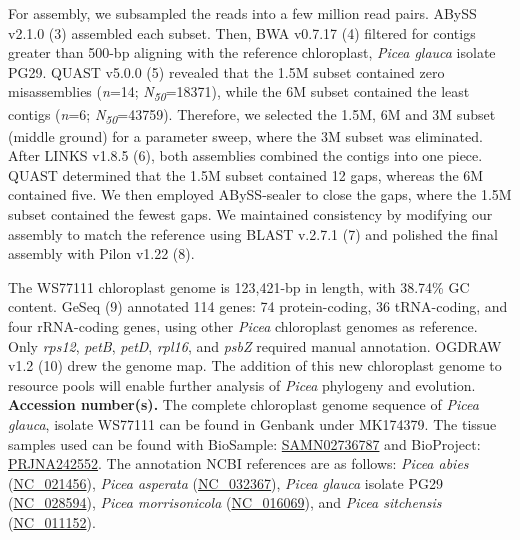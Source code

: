 \documentclass[titlepage,11pt, oneside]{article}   	%
\begin{document}
\newline
\par
For assembly, we subsampled the reads into a few million read pairs. ABySS v2.1.0 (3) assembled each subset. Then, BWA v0.7.17 (4) filtered for contigs greater than 500-bp aligning with the reference chloroplast, \textit{Picea glauca} isolate PG29. QUAST v5.0.0 (5) revealed that the 1.5M subset contained zero misassemblies (\textit{n}=14; \textit{N\textsubscript{50}}=18371), while the 6M subset contained the least contigs (\textit{n}=6; \textit{N\textsubscript{50}}=43759). Therefore, we selected the 1.5M, 6M and 3M subset (middle ground) for a parameter sweep, where the 3M subset was eliminated. After LINKS v1.8.5 (6), both assemblies combined the contigs into one piece. QUAST determined that the 1.5M subset contained 12 gaps, whereas the 6M contained five. We then employed ABySS-sealer to close the gaps, where the 1.5M subset contained the fewest gaps. We maintained consistency by modifying our assembly to match the reference using BLAST v.2.7.1 (7) and polished the final assembly with Pilon v1.22 (8). 
\newline
\par
The WS77111 chloroplast genome is 123,421-bp in length, with 38.74\% GC content. GeSeq (9) annotated 114 genes: 74 protein-coding, 36 tRNA-coding, and four rRNA-coding genes, using other  \textit{Picea} chloroplast genomes as reference. Only \textit{rps12}, \textit{petB}, \textit{petD}, \textit{rpl16}, and \textit{psbZ} required manual annotation. OGDRAW v1.2 (10) drew the genome map.  The addition of this new chloroplast genome to resource pools will enable further analysis of \textit{Picea} phylogeny and evolution.
\newline
\newline
\textbf{Accession number(s).} The complete chloroplast genome sequence of \textit{Picea glauca}, isolate WS77111 can be found in Genbank under MK174379. The tissue samples used can be found with BioSample: \href{https://www.ncbi.nlm.nih.gov/biosample/?term=SAMN02736787}{SAMN02736787} and BioProject: \href{https://www.ncbi.nlm.nih.gov/bioproject/?term=PRJNA242552}{PRJNA242552}. The annotation NCBI references are as follows: \textit{Picea abies} (\href{https://www.ncbi.nlm.nih.gov/nuccore/NC_021456}{NC\_021456}), \textit{Picea asperata} (\href{https://www.ncbi.nlm.nih.gov/nuccore/NC_032367}{NC\_032367}), \textit{Picea glauca} isolate PG29 (\href{https://www.ncbi.nlm.nih.gov/nuccore/NC_028594}{NC\_028594}), \textit{Picea morrisonicola} (\href{https://www.ncbi.nlm.nih.gov/nuccore/NC_016069}{NC\_016069}), and \textit{Picea sitchensis }(\href{https://www.ncbi.nlm.nih.gov/nuccore/NC_011152}{NC\_011152}).
\end{document}
